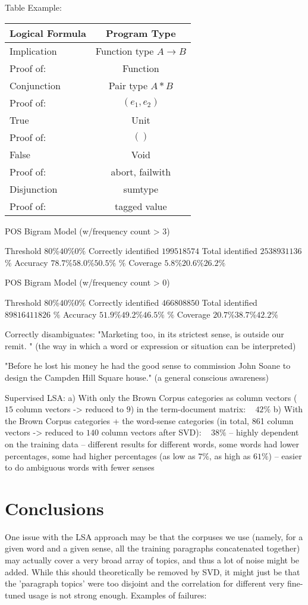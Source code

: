 \documentclass[10pt, letterpaper]{article}
\begin{document}
	Table Example: 
    \begin{tabular} {l | c}
	 \hline
		Logical Formula & Program Type \\ \hline
		Implication & Function type $A \rightarrow B$\\ Proof of: & Function \\ \hline
		Conjunction & Pair type $A * B$ \\ Proof of: &  $(e_1, e_2)$ \\ \hline
		True & Unit \\ Proof of: &  $()$ \\ \hline
		False & Void \\ Proof of: & abort, failwith \\ \hline
		Disjunction & sumtype \\ Proof of: & tagged value \\ \hline
	 \end{tabular}

	POS Bigram Model (w/frequency count > 3)

	Threshold	$80\%	40\%	0\%$
	Correctly identified	$199	518	574$
	Total identified	$253	893	1136$
	$\%$ Accuracy	$78.7\%	58.0\%	50.5\%$
	$\%$ Coverage	$5.8\%	20.6\%	26.2\%$

	POS Bigram Model (w/frequency count > 0)

	Threshold	$80\%	40\%	0\%$
	Correctly identified	$466	808	850$
	Total identified	$898	1641	1826$
	$\%$ Accuracy	$51.9\%	49.2\%	46.5\%$
	$\%$ Coverage	$20.7\%	38.7\%	42.2\%$

	Correctly disambiguates:
	"Marketing too, in its strictest sense, is outside our remit. " (the way in which a word or expression or situation can be interpreted)	

	"Before he lost his money he had the good sense to commission John Soane to design the Campden Hill Square house." (a general conscious awareness)

	Supervised LSA: 
	a) With only the Brown Corpus categories as column vectors ($15$ column vectors -> reduced to $9$) in the term-document matrix: ~ $42\%$
	b) With the Brown Corpus categories + the word-sense categories (in total, 861 column vectors -> reduced to $140$ column vectors after SVD): ~ $38\%$
	-- highly dependent on the training data -- different results for different words, some words had lower percentages, some had higher percentages (as low as $7\%$, as high as $61\%$)
	-- easier to do ambiguous words with fewer senses

	\section{Conclusions}
	One issue with the LSA approach may be that the corpuses we use (namely, for a given word and a given sense, all the training paragraphs concatenated together) may actually cover a very broad array of topics, and thus a lot of noise might be added. While this should theoretically be removed by SVD, it might just be that the 'paragraph topics' were too disjoint and the correlation for different very fine-tuned usage is not strong enough. 
	Examples of failures: 
\end{document}
